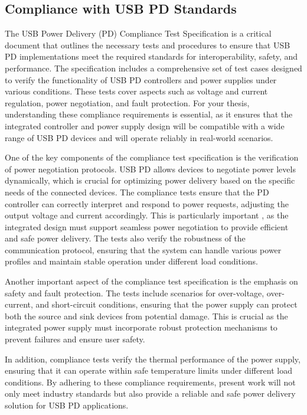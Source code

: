 \subsection{Compliance with USB PD Standards}
The USB Power Delivery (PD) Compliance Test Specification\cite{usb2024cts} is a critical document that outlines the necessary tests and procedures to ensure that USB PD implementations meet the required standards for interoperability, safety, and performance. The specification includes a comprehensive set of test cases designed to verify the functionality of USB PD controllers and power supplies under various conditions. These tests cover aspects such as voltage and current regulation, power negotiation, and fault protection. For your thesis, understanding these compliance requirements is essential, as it ensures that the integrated controller and power supply design will be compatible with a wide range of USB PD devices and will operate reliably in real-world scenarios.

One of the key components of the compliance test specification is the verification of power negotiation protocols\cite{er4}. USB PD allows devices to negotiate power levels dynamically, which is crucial for optimizing power delivery based on the specific needs of the connected devices. The compliance tests ensure that the PD controller can correctly interpret and respond to power requests, adjusting the output voltage and current accordingly. This is particularly important , as the integrated design must support seamless power negotiation to provide efficient and safe power delivery. The tests also verify the robustness of the communication protocol, ensuring that the system can handle various power profiles and maintain stable operation under different load conditions\cite{Shi2010}.

Another important aspect of the compliance test specification is the emphasis on safety and fault protection. The tests include scenarios for over-voltage, over-current, and short-circuit conditions, ensuring that the power supply can protect both the source and sink devices from potential damage. This is crucial as the integrated power supply must incorporate robust protection mechanisms to prevent failures and ensure user safety\cite{em_powergrid}. 

In addition, compliance tests verify the thermal performance of the power supply, ensuring that it can operate within safe temperature limits under different load conditions. By adhering to these compliance requirements, present work will not only meet industry standards but also provide a reliable and safe power delivery solution for USB PD applications.
